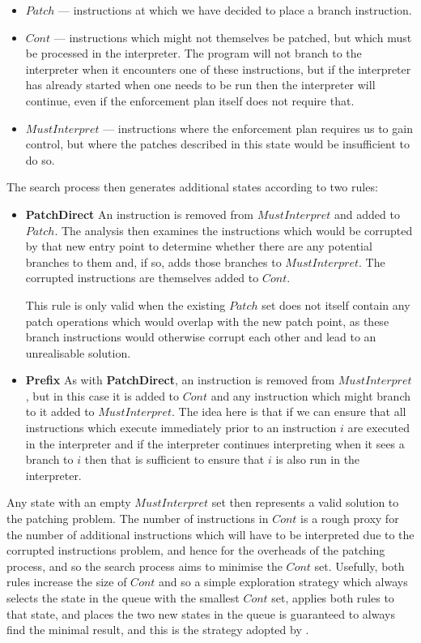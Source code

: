 \begin{itemize}
\item $\mathit{Patch}$ --- instructions at which we have decided to place a
  branch instruction.
\item $\mathit{Cont}$ --- instructions which might not themselves be
  patched, but which must be processed in the interpreter.  The
  program will not branch to the interpreter when it encounters one of
  these instructions, but if the interpreter has already started when
  one needs to be run then the interpreter will continue, even if the
  enforcement plan itself does not require that.
\item $\mathit{MustInterpret}$ --- instructions where the enforcement
  plan requires us to gain control, but where the patches described in
  this state would be insufficient to do so.
\end{itemize}

The search process then generates additional states according to two
rules:

\begin{itemize}
\item
  \textbf{PatchDirect} An instruction is removed from
  $\mathit{MustInterpret}$ and added to $\mathit{Patch}$.  The
  analysis then examines the instructions which would be corrupted by
  that new entry point to determine whether there are any potential
  branches to them and, if so, adds those branches to
  $\mathit{MustInterpret}$.  The corrupted instructions are themselves
  added to $\mathit{Cont}$.

  This rule is only valid when the existing $\mathit{Patch}$ set does
  not itself contain any patch operations which would overlap with the
  new patch point, as these branch instructions would otherwise
  corrupt each other and lead to an unrealisable solution.
\item
  \textbf{Prefix} As with \textbf{PatchDirect}, an instruction is
  removed from $\mathit{MustInterpret}$, but in this case it is added
  to $\mathit{Cont}$ and any instruction which might branch to it
  added to $\mathit{MustInterpret}$.  The idea here is that if we can
  ensure that all instructions which execute immediately prior to an
  instruction $i$ are executed in the interpreter and if the
  interpreter continues interpreting when it sees a branch to $i$ then
  that is sufficient to ensure that $i$ is also run in the
  interpreter.
\end{itemize}

Any state with an empty $\mathit{MustInterpret}$ set then represents a
valid solution to the patching problem.  The number of instructions in
$\mathit{Cont}$ is a rough proxy for the number of additional
instructions which will have to be interpreted due to the corrupted
instructions problem, and hence for the overheads of the patching
process, and so the search process aims to minimise the
$\mathit{Cont}$ set.  Usefully, both rules increase the size of
$\mathit{Cont}$ and so a simple exploration strategy which always
selects the state in the queue with the smallest $\mathit{Cont}$ set,
applies both rules to that state, and places the two new states in the
queue is guaranteed to always find the minimal result, and this is the
strategy adopted by {\implementation}.


